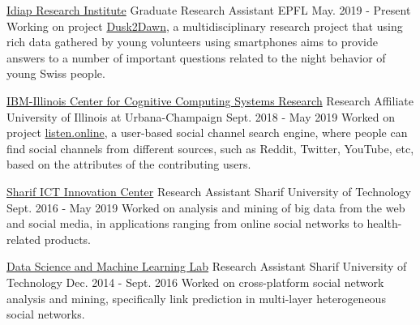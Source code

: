 \begin{cventries}

  \cventry
    {\href{https://idiap.ch}{Idiap Research Institute}}
    {Graduate Research Assistant}
    {EPFL}
    {May. 2019 - Present}
    {
      Working on project \href{http://www.idiap.ch/project/dusk2dawn/}{Dusk2Dawn}, a multidisciplinary research project that using rich data gathered by young volunteers using smartphones aims to provide answers to a number of important questions related to the night behavior of young Swiss people. 
    }

  \cventry
    {\href{https://www.c3sr.com/participants/}{IBM-Illinois Center for Cognitive Computing Systems Research}}
    {Research Affiliate}
    {University of Illinois at Urbana-Champaign}
    {Sept. 2018 - May 2019}
    {
      Worked on project \href{http://listen.online}{listen.online}, a user-based social channel search engine, where people can find social channels from different sources, such as Reddit, Twitter, YouTube, etc, based on the attributes of the contributing users. %
    }
    
  \cventry
    {\href{https://www.linkedin.com/company/sharif-ict-innovation-center/}{Sharif ICT Innovation Center}}
    {Research Assistant}
    {Sharif University of Technology}
    {Sept. 2016 - May 2019}
    {
      Worked on analysis and mining of big data from the web and social media, in applications ranging from online social networks to health-related products.
    }
    
  \cventry
    {\href{http://dml.ce.sharif.edu/dmlsite/?q=people}{Data Science and Machine Learning Lab}}
    {Research Assistant}
    {Sharif University of Technology}
    {Dec. 2014 - Sept. 2016}
    {
      Worked on cross-platform social network analysis and mining, specifically link prediction in multi-layer heterogeneous social networks.
    }
\end{cventries}

